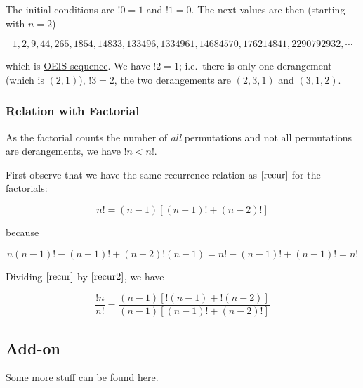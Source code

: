 The initial conditions are \(!0=1\) and \(!1=0\). The next values are
then (starting with \(n = 2\))

\[
1, 2, 9, 44, 265, 1854, 14833, 133496, 1334961, 14684570, 176214841, 2290792932, \cdots
\]

which is \href{https://oeis.org/A000166}{OEIS sequence}. We have
\(!2 = 1\); i.e.~there is only one derangement (which is \((2,1)\)),
\(!3 = 2\), the two derangements are \((2,3,1)\) and \((3,1,2)\).

\subsubsection{Relation with Factorial}

As the factorial counts the number of \emph{all} permutations and not
all permutations are derangements, we have \(!n < n!\).

First observe that we have the same recurrence relation as
\(\eqref{recur}\) for the factorials:

\begin{equation}
\label{recur2}
n!= (n-1) \left[ (n-1)! +  (n-2)!\right]
\end{equation}

because

\[
n(n-1)! - (n-1)! + (n-2)! (n-1) = n! - (n-1)! + (n-1)! = n!
\]

Dividing \(\eqref{recur}\) by \(\eqref{recur2}\), we have

\[
\frac{!n}{n!} = \frac{ (n-1) \left[ !(n-1) +  !(n-2)\right] }{ (n-1) \left[ (n-1)! +  (n-2)!\right] }
\]

\subsection{Add-on}

Some more stuff can be found
\href{http://math.ucr.edu/home/baez/qg-winter2004/derangement.pdf}{here}.
